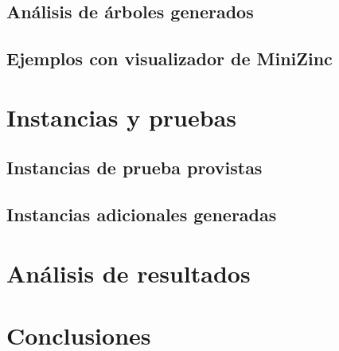\subsection{Análisis de árboles generados}

\subsection{Ejemplos con visualizador de MiniZinc}

\section{Instancias y pruebas}

\subsection{Instancias de prueba provistas}

\subsection{Instancias adicionales generadas}

\section{Análisis de resultados}

\section{Conclusiones}


